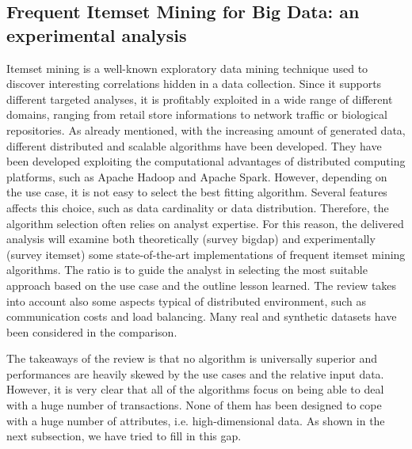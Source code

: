 \subsection{Frequent Itemset Mining for Big Data: an experimental analysis}
Itemset mining is a well-known exploratory data mining technique used to
discover interesting correlations hidden in a data collection. Since it supports
different targeted analyses, it is profitably exploited in a wide range
of different domains, ranging from retail store informations to network traffic or biological repositories. As already mentioned, with the increasing amount of generated data, different distributed and scalable algorithms
have been developed. They have been developed exploiting the computational advantages of distributed
computing platforms, such as Apache Hadoop and Apache Spark. However, depending on the use case, it is not easy to select the best fitting algorithm. Several features affects this choice, such as data cardinality or data distribution. Therefore, the algorithm selection often relies on analyst expertise. 
For this reason, the delivered analysis will examine both theoretically (survey bigdap) and experimentally (survey itemset) some state-of-the-art implementations of frequent itemset mining algorithms. The ratio is to guide the analyst in selecting the most suitable approach based on the use case and the outline lesson learned. 
The review takes into account also some aspects typical of distributed environment, such as communication costs and load balancing. Many real and synthetic datasets have been considered in the comparison.

The takeaways of the review is that no algorithm is universally superior and performances are heavily skewed by the use cases and the relative input data. However, it is very clear that all of the algorithms focus on being able to deal with a huge number of transactions. None of them has been designed to cope with a huge number of attributes, i.e. high-dimensional data. As shown in the next subsection, we have tried to fill in this gap.

